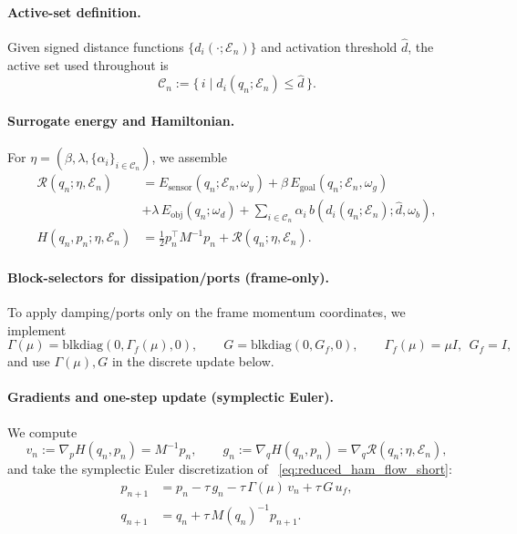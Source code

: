 \paragraph{Active-set definition.}
Given signed distance functions $\{d_i(\cdot;\mathcal{E}_n)\}$ and activation threshold $\hat d$, the
active set used throughout is
\begin{equation}
\label{eq:impl:active_set}
\mathcal{C}_n := \{\, i \mid d_i(q_n;\mathcal{E}_n)\le \hat d \,\}.
\end{equation}

\paragraph{Surrogate energy and Hamiltonian.}
For $\eta=(\beta,\lambda,\{\alpha_i\}_{i\in\mathcal{C}_n})$, we assemble
\begin{align}
\label{eq:impl:surrogate_energy}
\mathcal{R}(q_n;\eta,\mathcal{E}_n)
&=
E_{\mathrm{sensor}}(q_n;\mathcal{E}_n,\omega_y)
+\beta\,E_{\mathrm{goal}}(q_n;\mathcal{E}_n,\omega_g) \\
&+\lambda\,E_{\mathrm{obj}}(q_n;\omega_d)
+\sum_{i\in\mathcal{C}_n}\alpha_i\, b(d_i(q_n;\mathcal{E}_n);\hat d,\omega_b),\\
\label{eq:impl:surrogate_hamiltonian}
H(q_n,p_n;\eta,\mathcal{E}_n)
&=\tfrac12 p_n^\top M^{-1}p_n+\mathcal{R}(q_n;\eta,\mathcal{E}_n).
\end{align}

\paragraph{Block-selectors for dissipation/ports (frame-only).}
To apply damping/ports only on the frame momentum coordinates, we implement
\begin{equation}
\label{eq:impl:block_selectors}
\Gamma(\mu) = \mathrm{blkdiag}(0,\Gamma_f(\mu),0),\qquad
G = \mathrm{blkdiag}(0,G_f,0),\qquad
\Gamma_f(\mu)=\mu I,\ \ G_f=I,
\end{equation}
and use $\Gamma(\mu),G$ in the discrete update below.

\paragraph{Gradients and one-step update (symplectic Euler).}
We compute
\begin{equation}
\label{eq:impl:gradients}
v_n := \nabla_p H(q_n,p_n)=M^{-1}p_n,\qquad
g_n := \nabla_q H(q_n,p_n)=\nabla_q \mathcal{R}(q_n;\eta,\mathcal{E}_n),
\end{equation}
and take the symplectic Euler discretization of ~\cref{eq:reduced_ham_flow_short}:
\begin{align}
\label{eq:impl:ph_euler_p}
p_{n+1} &= p_n-\tau\,g_n-\tau\,\Gamma(\mu)\,v_n+\tau\,G\,u_f,\\
\label{eq:impl:ph_euler_q}
q_{n+1} &= q_n+\tau\,M(q_n)^{-1}p_{n+1}.
\end{align}

